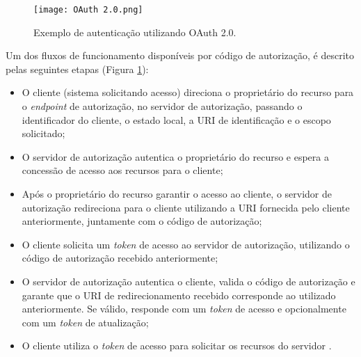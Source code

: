\begin{figure}[ht]
    \centering
    \texttt{[image: OAuth 2.0.png]}
    \caption{Exemplo de autenticação utilizando OAuth 2.0.}
    \label{fig:OAuth2}
\end{figure}

Um dos fluxos de funcionamento 
disponíveis por código de autorização, é descrito pelas seguintes etapas (Figura \ref{fig:OAuth2}):

\begin{itemize}
\item O cliente (sistema solicitando acesso) direciona o proprietário do recurso para o \emph{endpoint} de autorização, no servidor
de autorização, passando o identificador do cliente, o estado local, a URI de identificação e o 
escopo solicitado;
\item O servidor de autorização autentica o proprietário do recurso e espera a concessão de acesso 
aos recursos para o cliente;
\item Após o proprietário do recurso garantir o acesso ao cliente, o servidor de autorização 
redireciona para o cliente utilizando a URI fornecida pelo cliente anteriormente, juntamente com o 
código de autorização;
\item O cliente solicita um \emph{token} de acesso ao servidor de autorização, utilizando o código
de autorização recebido anteriormente;
\item O servidor de autorização autentica o cliente, valida o código de autorização e garante que o 
URI de redirecionamento recebido corresponde ao utilizado anteriormente. Se válido, responde com um 
\emph{token} de acesso e opcionalmente com um \emph{token} de atualização;
\item O cliente utiliza o \emph{token} de acesso para solicitar os recursos do servidor \cite{RFC6749}.
\end{itemize}
